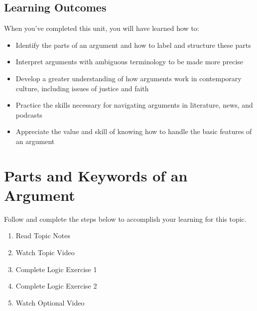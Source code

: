 \documentclass[
]{book}
\providecommand{\tightlist}{%
  \setlength{\itemsep}{0pt}\setlength{\parskip}{0pt}}
\begin{document}
\hypertarget{learning-outcomes-2}{%
\subsection*{Learning Outcomes}\label{learning-outcomes-2}}

When you've completed this unit, you will have learned how to:

\begin{itemize}
\tightlist
\item
  Identify the parts of an argument and how to label and structure these parts\\
\item
  Interpret arguments with ambiguous terminology to be made more precise\\
\item
  Develop a greater understanding of how arguments work in contemporary culture, including issues of justice and faith\\
\item
  Practice the skills necessary for navigating arguments in literature, news, and podcasts\\
\item
  Appreciate the value and skill of knowing how to handle the basic features of an argument
\end{itemize}

\hypertarget{parts-and-keywords-of-an-argument}{%
\section{Parts and Keywords of an Argument}\label{parts-and-keywords-of-an-argument}}

Follow and complete the steps below to accomplish your learning for this topic.

\begin{enumerate}
\def\labelenumi{\arabic{enumi}.}
\tightlist
\item
  Read Topic Notes\\
\item
  Watch Topic Video\\
\item
  Complete Logic Exercise 1\\
\item
  Complete Logic Exercise 2\\
\item
  Watch Optional Video
\end{enumerate}
\end{document}
